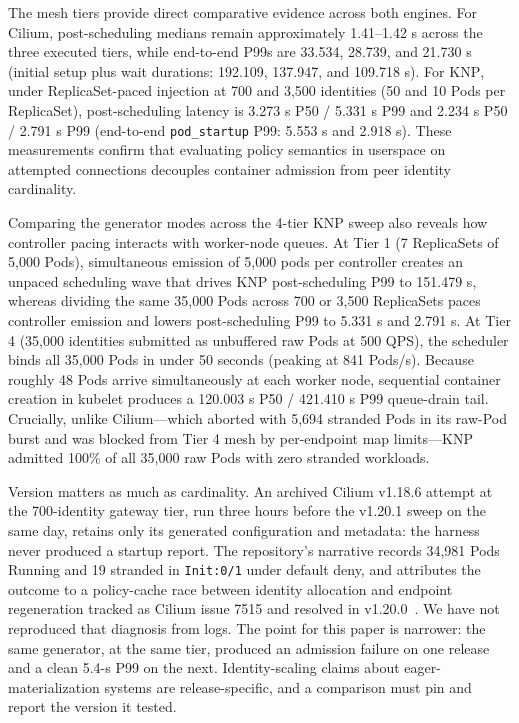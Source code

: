\documentclass[letterpaper,twocolumn,10pt]{article}
\newcommand{\sys}{\textsc{KNP}}
\begin{document}
The mesh tiers provide direct comparative evidence across both engines.
For Cilium, post-scheduling medians remain approximately 1.41--1.42 s
across the three executed tiers, while end-to-end P99s are 33.534, 28.739,
and 21.730 s (initial setup plus wait durations: 192.109, 137.947, and
109.718 s). For \sys{}, under ReplicaSet-paced injection at 700 and 3,500
identities (50 and 10 Pods per ReplicaSet), post-scheduling latency is
3.273 s P50 / 5.331 s P99 and 2.234 s P50 / 2.791 s P99 (end-to-end
\texttt{pod\_startup} P99: 5.553 s and 2.918 s). These measurements confirm that
evaluating policy semantics in userspace on attempted connections decouples
container admission from peer identity cardinality.

Comparing the generator modes across the 4-tier \sys{} sweep also reveals
how controller pacing interacts with worker-node queues. At Tier 1
(7 ReplicaSets of 5,000 Pods), simultaneous emission of 5,000 pods per
controller creates an unpaced scheduling wave that drives \sys{}
post-scheduling P99 to 151.479 s, whereas dividing the same 35,000 Pods
across 700 or 3,500 ReplicaSets paces controller emission and lowers
post-scheduling P99 to 5.331 s and 2.791 s. At Tier 4 (35,000 identities
submitted as unbuffered raw Pods at 500 QPS), the scheduler binds all
35,000 Pods in under 50 seconds (peaking at 841 Pods/s). Because roughly
48 Pods arrive simultaneously at each worker node, sequential container
creation in kubelet produces a 120.003 s P50 / 421.410 s P99 queue-drain
tail. Crucially, unlike Cilium---which aborted with 5,694 stranded Pods in
its raw-Pod burst and was blocked from Tier 4 mesh by per-endpoint map limits---\sys{}
admitted 100\% of all 35,000 raw Pods with zero stranded workloads.

Version matters as much as cardinality. An archived Cilium v1.18.6
attempt at the 700-identity gateway tier, run three hours before the
v1.20.1 sweep on the same day, retains only its generated configuration
and metadata: the harness never produced a startup report. The repository's narrative
records 34,981 Pods Running and 19 stranded in \texttt{Init:0/1} under
default deny, and attributes the outcome to a policy-cache race between
identity allocation and endpoint regeneration tracked as Cilium issue
7515 and resolved in v1.20.0~\cite{cilium7515}. We have not reproduced
that diagnosis from logs. The point for this paper is narrower: the
same generator, at the same tier, produced an admission failure on one
release and a clean 5.4-s P99 on the next. Identity-scaling claims
about eager-materialization systems are release-specific, and a
comparison must pin and report the version it tested.
\end{document}
